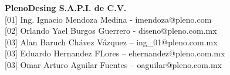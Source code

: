 \def\vhhistoryname{Revisión}%
\def\vhversionname{Versión}%
\def\vhdatename{Fecha}%
\def\vhauthorname{Autor}%
\def\vhchangename{Descripción}%

\begin{versionhistory}
\end{versionhistory}

\vfill 

\noindent\large\textbf{PlenoDesing S.A.P.I. de C.V.}\\

\noindent\normalsize [01] Ing. Ignacio Mendoza Medina - imendoza@pleno.com\\
\noindent\normalsize [02] Orlando Yael Burgos Guerrero - diseno@pleno.com.mx\\
\noindent\normalsize [03] Alan Baruch Chávez Vázquez – ing\_01@pleno.com.mx\\
\noindent\normalsize [03] Eduardo Hernandez FLores – ehernandez@pleno.com.mx\\
\noindent\normalsize [03] Omar Arturo Aguilar Fuentes – oaguilar@pleno.com.mx\\


